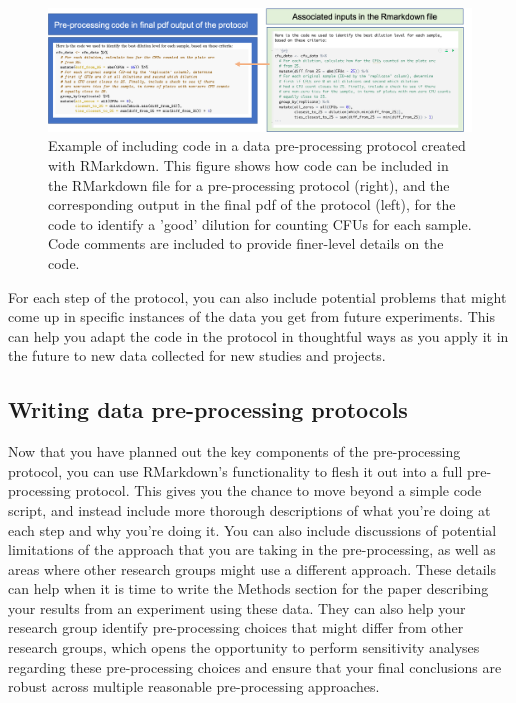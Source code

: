\documentclass[]{tufte-book}
\begin{document}
\begin{figure}
\includegraphics[width=\textwidth]{figures/protocol_code} \caption[Example of including code in a data pre-processing protocol created with RMarkdown]{Example of including code in a data pre-processing protocol created with RMarkdown. This figure shows how code can be included in the RMarkdown file for a pre-processing protocol (right), and the corresponding output in the final pdf of the protocol (left), for the code to identify a 'good' dilution for counting CFUs for each sample. Code comments are included to provide finer-level details on the code.}\label{fig:protocolcode}
\end{figure}

For each step of the protocol, you can also include potential problems
that might come up in specific instances of the data you get from
future experiments. This can help you adapt the code in the protocol in
thoughtful ways as you apply it in the future to new data collected
for new studies and projects.

\hypertarget{writing-data-pre-processing-protocols}{%
\subsection{Writing data pre-processing protocols}\label{writing-data-pre-processing-protocols}}

Now that you have planned out the key components of the pre-processing protocol,
you can use RMarkdown's functionality to flesh it out into a full pre-processing
protocol. This gives you the chance to move beyond a simple code script, and
instead include more thorough descriptions of what you're doing at each step and
why you're doing it. You can also include discussions of potential limitations
of the approach that you are taking in the pre-processing, as well as areas
where other research groups might use a different approach. These details can
help when it is time to write the Methods section for the paper describing your
results from an experiment using these data. They can also help your research
group identify pre-processing choices that might differ from other research
groups, which opens the opportunity to perform sensitivity analyses regarding
these pre-processing choices and ensure that your final conclusions are robust
across multiple reasonable pre-processing approaches.
\end{document}
